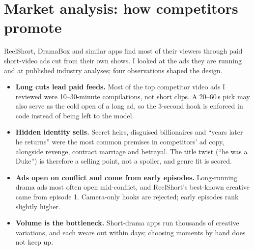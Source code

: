 \documentclass[10pt]{article}
\begin{document}
\section{Market analysis: how competitors promote}
ReelShort, DramaBox and similar apps find most of their viewers through paid short-video ads cut from their own shows.
I looked at the ads they are running and at published industry analyses; four observations shaped the design.
\begin{itemize}
\item \textbf{Long cuts lead paid feeds.} Most of the top competitor video ads I reviewed were 10--30-minute
compilations, not short clips. A 20--60\,s pick may also serve as the cold open of a long ad, so the 3-second hook is
enforced in code instead of being left to the model.
\item \textbf{Hidden identity sells.} Secret heirs, disguised billionaires and ``years later he returns'' were the most
common premises in competitors' ad copy, alongside revenge, contract marriage and betrayal. The title twist (``he was a
Duke'') is therefore a selling point, not a spoiler, and genre fit is scored.
\item \textbf{Ads open on conflict and come from early episodes.} Long-running drama ads most often open mid-conflict,
and ReelShort's best-known creative came from episode 1. Camera-only hooks are rejected; early episodes rank slightly higher.
\item \textbf{Volume is the bottleneck.} Short-drama apps run thousands of creative variations, and each wears out within
days; choosing moments by hand does not keep up.
\end{itemize}
\end{document}
